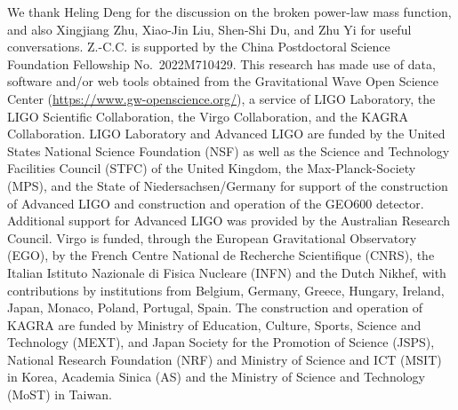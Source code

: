 \documentclass[
reprint,           %
superscriptaddress,%
amsmath,           %
amssymb,           %
aps,               %
prd,               %
notitlepage,       %
longbibliography,  %
floatfix,          %
nofootinbib,
]{revtex4-1}
\begin{document}
\begin{acknowledgments}
We thank Heling Deng for the discussion on the broken power-law mass function, and also Xingjiang Zhu, Xiao-Jin Liu, Shen-Shi Du, and Zhu Yi for useful conversations.
Z.-C.C. is supported by the China Postdoctoral Science Foundation Fellowship No.~2022M710429.
This research has made use of data, software and/or web tools obtained from the Gravitational Wave Open Science Center (\url{https://www.gw-openscience.org/}), a service of LIGO Laboratory, the LIGO Scientific Collaboration, the Virgo Collaboration, and the KAGRA Collaboration. 
LIGO Laboratory and Advanced LIGO are funded by the United States National Science Foundation (NSF) as well as the Science and Technology Facilities Council (STFC) of the United Kingdom, the Max-Planck-Society (MPS), and the State of Niedersachsen/Germany for support of the construction of Advanced LIGO and construction and operation of the GEO600 detector. Additional support for Advanced LIGO was provided by the Australian Research Council. Virgo is funded, through the European Gravitational Observatory (EGO), by the French Centre National de Recherche Scientifique (CNRS), the Italian Istituto Nazionale di Fisica Nucleare (INFN) and the Dutch Nikhef, with contributions by institutions from Belgium, Germany, Greece, Hungary, Ireland, Japan, Monaco, Poland, Portugal, Spain. The construction and operation of KAGRA are funded by Ministry of Education, Culture, Sports, Science and Technology (MEXT), and Japan Society for the Promotion of Science (JSPS), National Research Foundation (NRF) and Ministry of Science and ICT (MSIT) in Korea, Academia Sinica (AS) and the Ministry of Science and Technology (MoST) in Taiwan.
\end{acknowledgments}	
	

\end{document}
